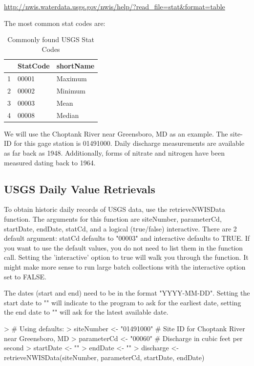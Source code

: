 \documentclass[a4paper,11pt]{article}
\begin{document}
\url{http://nwis.waterdata.usgs.gov/nwis/help/?read_file=stat&format=table}

The most common stat codes are:
\begin{table}[ht]
\begin{center}
\caption{Commonly found USGS Stat Codes}
\begin{tabular}{rll}
  \hline
 & StatCode & shortName \\ 
  \hline
1 & 00001 & Maximum \\ 
  2 & 00002 & Minimum \\ 
  3 & 00003 & Mean \\ 
  4 & 00008 & Median \\ 
   \hline
\end{tabular}
\end{center}
\end{table}

We will use the Choptank River near Greensboro, MD as an example.  The site-ID for this gage station is 01491000. Daily discharge measurements are available as far back as 1948.  Additionally, forms of nitrate and nitrogen have been measured dating back to 1964.

\subsection{USGS Daily Value Retrievals}
To obtain historic daily records of USGS data, use the retrieveNWISData function. The arguments for this function are siteNumber, parameterCd, startDate, endDate, statCd, and a logical (true/false) interactive. There are 2 default argument: statCd defaults to "00003" and interactive defaults to TRUE.  If you want to use the default values, you do not need to list them in the function call. Setting the 'interactive' option to true will walk you through the function. It might make more sense to run large batch collections with the interactive option set to FALSE. 

The dates (start and end) need to be in the format "YYYY-MM-DD".  Setting the start date to "" will indicate to the program to ask for the earliest date, setting the end date to "" will ask for the latest available date.

\begin{Schunk}
\begin{Sinput}
> # Using defaults:
> siteNumber <- "01491000" # Site ID for Choptank River near Greensboro, MD
> parameterCd <- "00060"  # Discharge in cubic feet per second
> startDate <- ""
> endDate <- ""
> discharge <- retrieveNWISData(siteNumber, parameterCd, startDate, endDate)
\end{Sinput}
\end{Schunk}
\end{document}
